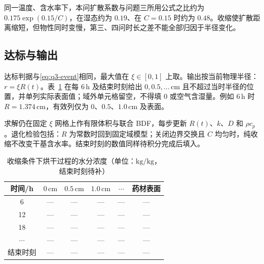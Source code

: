 同一温度、含水率下，本问扩散系数与问题三所用公式之比约为 $0.175\exp(0.15/C)$，在湿态约为 $0.19$、在 $C=0.15$ 时约为 $0.48$。收缩使扩散距离缩短，但物性同时变慢，第三、四问时长之差不能全部归因于半径变化。

\subsection{达标与输出}

达标判据与\eqref{eq:q3-event}相同，最大值在 $\xi\in[0,1]$ 上取。输出按当前物理半径：$r=\xi R(t)$。表~\ref{tab:q4C} 在每 $6\,\mathrm{h}$ 及结束时刻给出 $0,0.5,\ldots\,\mathrm{cm}$ 且不超过当时半径的位置，并单列实际表面值；域外单元格留空，不得填 $0$ 或空气含湿量。例如 $6\,\mathrm{h}$ 时 $R=1.374\,\mathrm{cm}$，有效列仅为 $0$、$0.5$、$1.0\,\mathrm{cm}$ 及表面。

求解仍在固定 $\xi$ 网格上作有限体积与联合 BDF，每步更新 $R(t)$、$k$、$D$ 和 $\rho c_p$。退化检验包括：$R$ 为常数时回到固定域模型；关闭边界交换且 $C$ 均匀时，纯收缩不改变干基含水率。结束时刻的数值同样待积分完成后填入。

\begin{table}[htbp]
\centering
\caption{收缩条件下烘干过程的水分浓度（单位：$\mathrm{kg/kg}$，结束时刻待补）}
\label{tab:q4C}
\begin{tabular}{cccccc}
\toprule
时间/h & $0\,\mathrm{cm}$ & $0.5\,\mathrm{cm}$ & $1.0\,\mathrm{cm}$ & $\cdots$ & 药材表面 \\
\midrule
6  & --- & --- & --- & --- & --- \\
12 & --- & --- & --- & --- & --- \\
18 & --- & --- & --- & --- & --- \\
$\cdots$ & --- & --- & --- & --- & --- \\
结束时刻 & --- & --- & --- & --- & --- \\
\bottomrule
\end{tabular}
\end{table}

